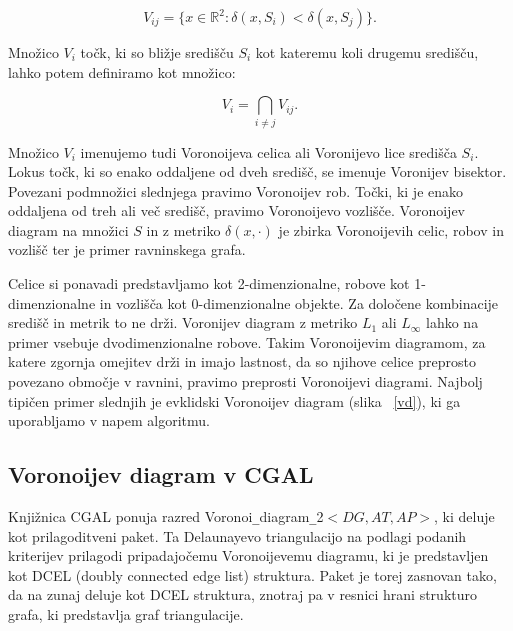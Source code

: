 \documentclass[a4paper, 12pt]{book}
\begin{document}
\begin{equation}
V_{ij} = \{x \in \mathbb{R}^2: \delta(x,S_i) < \delta(x,S_j)\}. 
\end{equation}

Množico $V_i$ točk, ki so bližje središču $S_i$ kot kateremu koli drugemu središču, lahko potem definiramo kot množico:

\begin{equation}
V_i = \bigcap_{i \neq j} V_{ij} .
\end{equation}



Množico $V_i$ imenujemo tudi Voronoijeva celica ali Voronijevo lice središča $S_i$. Lokus točk, ki so enako oddaljene od dveh središč, se imenuje Voronijev bisektor. Povezani podmnožici slednjega pravimo Voronoijev rob. Točki, ki je enako oddaljena od treh ali več središč, pravimo Voronoijevo vozlišče. Voronoijev diagram na množici $S$ in z metriko $\delta(x,\cdot)$ je zbirka Voronoijevih celic, robov in vozlišč ter je primer ravninskega grafa.

Celice si ponavadi predstavljamo kot 2-dimenzionalne, robove kot 1-dimenzionalne in vozlišča kot 0-dimenzionalne objekte. Za določene kombinacije središč in metrik to ne drži. Voronijev diagram z metriko $L_1$ ali $L_{\infty}$ lahko na primer vsebuje dvodimenzionalne robove. Takim Voronoijevim diagramom, za katere zgornja omejitev drži in imajo lastnost, da so njihove celice preprosto povezano območje v ravnini, pravimo preprosti Voronoijevi diagrami. Najbolj tipičen primer slednjih je evklidski Voronoijev diagram (slika ~\ref{vd}), ki ga uporabljamo v napem algoritmu.

\subsection{Voronoijev diagram v CGAL}
Knjižnica CGAL ponuja razred Voronoi\texttt{\_}diagram\texttt{\_}2$<DG,AT,AP>$, ki deluje kot prilagoditveni paket. Ta Delaunayevo triangulacijo na podlagi podanih kriterijev prilagodi pripadajočemu Voronoijevemu diagramu, ki je predstavljen kot DCEL (doubly connected edge list) struktura. Paket je torej zasnovan tako, da na zunaj deluje kot DCEL struktura, znotraj pa v resnici hrani strukturo grafa, ki predstavlja graf triangulacije.
\end{document}
